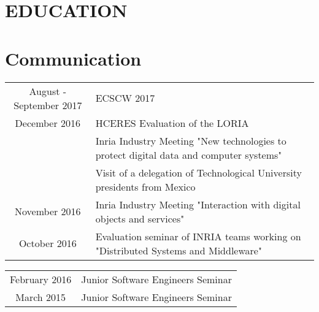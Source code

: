 \section{EDUCATION}

\descript{}
\sectionsep


\section{Communication}

\descript{}
\vspace{5pt}
\begin{tabular}{cp{150mm}}
August - September 2017    & ECSCW 2017\\
December 2016       & HCERES Evaluation of the LORIA\\
                    & Inria Industry Meeting "New technologies to protect digital data and computer systems"\\
                    & Visit of a delegation of Technological University presidents from Mexico\\
November 2016       & Inria Industry Meeting "Interaction with digital objects and services"\\
October 2016        & Evaluation seminar of INRIA teams working on "Distributed Systems and Middleware"\\
\end{tabular}
\sectionsep
\sectionsep

\descript{}
\vspace{5pt}
\begin{tabular}{cl}
February 2016        & Junior Software Engineers Seminar\\
March 2015           & Junior Software Engineers Seminar\\
\end{tabular}
\sectionsep

\hfill

